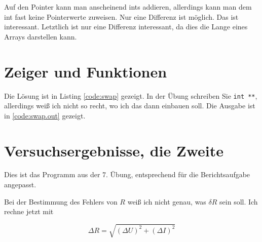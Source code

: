 Auf den Pointer kann man anscheinend ints addieren, allerdings kann man dem int fast keine Pointerwerte zuweisen. Nur eine Differenz ist möglich. Das ist interessant. Letztlich ist nur eine Differenz interessant, da dies die Lange eines Arrays darstellen kann.

\section{Zeiger und Funktionen}

Die Lösung ist in Listing \ref{code:swap} gezeigt. In der Übung schreiben Sie \texttt{int **}, allerdings weiß ich nicht so recht, wo ich das dann einbauen soll. Die Ausgabe ist in \ref{code:swap.out} gezeigt.


\section{Versuchsergebnisse, die Zweite}

Dies ist das Programm aus der 7. Übung, entsprechend für die Berichtsaufgabe angepasst.

Bei der Bestimmung des Fehlers von $R$ weiß ich nicht genau, was $\delta R$ sein soll. Ich rechne jetzt mit

\begin{equation}
\Delta R = \sqrt{(\Delta U)^2 + (\Delta I)^2}
\end{equation}

